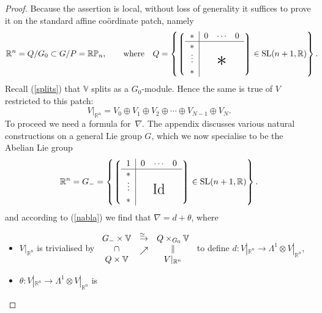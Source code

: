 \begin{proof}
Because the assertion is local, without loss of generality it suf\/f\/ices to prove
it on the standard af\/f\/ine co\"ordinate patch, namely
\begin{gather}\label{Q}
{\mathbb{R}}^n=Q/G_0\subset G/P={\mathbb{RP}}_n,\qquad\mbox{where}\quad
Q=\left\{
\left\lgroup\begin{tabular}{c|ccc}$\ast$&$0$&$\!\cdots\!$&$0$\\ \hline
$\ast$\\
\raisebox{2pt}[15pt]{$\vdots$}&&
\raisebox{-2pt}[0pt][0pt]{\makebox[0pt]{\Huge$\ast$}}\\
$\ast$\end{tabular}\right\rgroup\in{\mathrm{SL}}(n+1,{\mathbb{R}})\right\}.\!\!\!\!
\end{gather}
Recall (\ref{splits}) that ${\mathbb{V}}$ splits as a $G_0$-module. Hence the
same is true of $V$ restricted to this patch:%
\begin{equation}\label{Vsplitting}V|_{{\mathbb{R}}^n}
=V_0\oplus V_1\oplus V_2\oplus\cdots\oplus V_{N-1}\oplus V_N.\end{equation}
To proceed we need a formula for~$\nabla$. The appendix discusses various
natural constructions on a general Lie group $G$, which we now specialise to
be the Abelian Lie group
\[{\mathbb{R}}^n=
G_-=\left\{
\left\lgroup\begin{tabular}{c|ccc}$1$&$0$&$\!\cdots\!$&$0$\\ \hline
$\ast$\\
\raisebox{2pt}[15pt]{$\vdots$}&&
\raisebox{-2pt}[0pt][0pt]{\makebox[0pt]{\LARGE${\mathrm{Id}}$}}\\
$\ast$\end{tabular}\right\rgroup\in{\mathrm{SL}}(n+1,{\mathbb{R}})\right\}.\]
and according to (\ref{nabla}) we f\/ind that $\nabla=d+\theta$, where
\begin{itemize}\itemsep=0pt
\item $V|_{{\mathbb{R}}^n}$ is trivialised by
$\begin{array}{ccc}G_-\times{\mathbb{V}}&
\stackrel{\simeq\:\:}{\rightarrow}&Q\times_{G_0}{\mathbb{V}}\\
\cap&\raisebox{-2pt}{$\nearrow$}&\|\\
Q\times{\mathbb{V}}&&V|_{{\mathbb{R}}^n}
\end{array}$ to def\/ine
$d:V|_{{\mathbb{R}}^n}\to\Lambda^1\otimes V|_{{\mathbb{R}}^n}$,
\item $\theta:V|_{{\mathbb{R}}^n}\to\Lambda^1\otimes V|_{{\mathbb{R}}^n}$ is

\end{itemize}
\end{proof}
